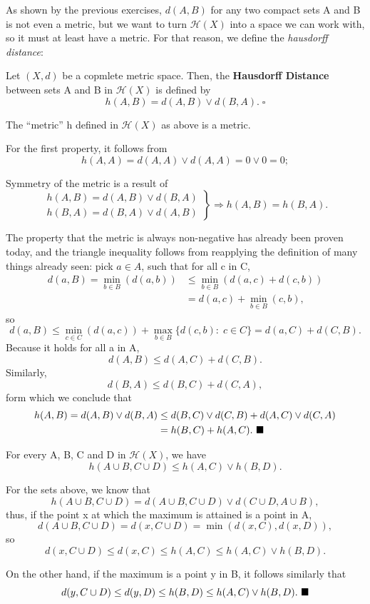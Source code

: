 \documentclass[../fractals_everywhere.tex]{subfiles}
\begin{document}
As shown by the previous exercises, \(d(A, B)\) for any two compact sets A and B is not even a metric, but we want to turn \(\mathcal{H}(X)\) into a space we can work with, so it must at least have a metric.
For that reason, we define the \textit{hausdorff distance}:
\begin{def*}
	Let \((X, d)\) be a copmlete metric space. Then, the \textbf{Hausdorff Distance} between sets A and B in \(\mathcal{H}(X)\) is defined by
	\[
		h(A, B) = d(A, B)\vee d(B, A). \; \square
	\]
\end{def*}
\begin{prop*}
	The ``metric'' h defined in \(\mathcal{H}(X)\) as above is a metric.
\end{prop*}
\begin{proof*}
	For the first property, it follows from
	\[
		h(A, A) = d(A, A)\vee d(A, A) = 0 \vee 0 = 0;
	\]

	Symmetry of the metric is a result of
	\[
		\left.\begin{array}{ll}
			h(A, B) = d(A, B)\vee d(B,A) \\
			h(B, A) = d(B, A)\vee d(A, B)
		\end{array}\right\} \Rightarrow h(A, B) = h(B, A).
	\]

	The property that the metric is always non-negative has already been proven today, and the triangle inequality follows from reapplying the definition of many things already seen: pick \(a\in A\), such that for all c in C,
	\begin{align*}
		d(a, B) = \min\limits_{b\in B}(d(a, b)) & \leq \min\limits_{b\in B}(d(a, c) + d(c, b)) \\
		                                        & = d(a, c) + \min\limits_{b\in B}(c, b),
	\end{align*}
	so
	\[
		d(a, B)\leq \min\limits_{c\in C}(d(a, c)) + \max\limits_{b\in B}\{d(c, b):\; c\in C\}= d(a, C) + d(C, B).
	\]
	Because it holds for all a in A,
	\[
		d(A, B) \leq  d(A, C) + d(C, B).
	\]
	Similarly,
	\[
		d(B, A) \leq d(B, C) + d(C, A),
	\]
	form which we conclude that
	\begin{align*}
		h(A, B) = d(A, B)\vee d(B, A) & \leq d(B, C)\vee d(C, B) + d(A, C)\vee d(C, A) \\
		                              & = h(B, C) + h(A, C). \text{ $\blacksquare$}
	\end{align*}
\end{proof*}
\begin{prop*}
	For every A, B, C and D in \(\mathcal{H}(X)\), we have
	\[
		h(A\cup B, C\cup D) \leq h(A, C) \vee h(B, D).
	\]
\end{prop*}
\begin{proof*}
	For the sets above, we know that
	\[
		h(A\cup B, C\cup D) = d(A\cup B, C\cup D)\vee d(C\cup D, A\cup B),
	\]
	thus, if the point x at which the maximum is attained is a point in A,
	\[
		d(A\cup B, C\cup D) = d(x, C\cup D) = \min(d(x, C), d(x, D)),
	\]
	so
	\[
		d(x, C\cup D) \leq d(x, C) \leq h(A, C) \leq h(A, C)\vee h(B, D).
	\]

	On the other hand, if the maximum is a point y in B, it follows similarly that
	\[
		d(y,C\cup D) \leq d(y, D) \leq h(B, D)\leq h(A, C)\vee h(B, D). \text{ $\blacksquare$}
	\]
\end{proof*}
\end{document}
